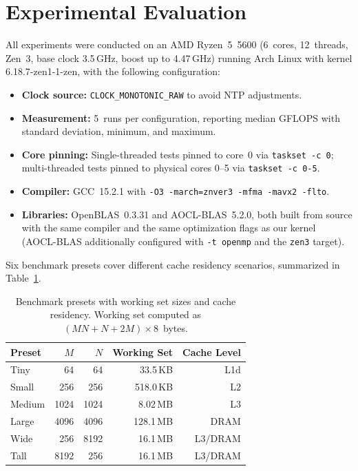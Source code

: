 \documentclass[runningheads]{llncs}
\begin{document}
\section{Experimental Evaluation}
\label{sec:results}

All experiments were conducted on an AMD Ryzen~5~5600 (6~cores, 12~threads,
Zen~3, base clock 3.5\,GHz, boost up to 4.47\,GHz) running Arch Linux with
kernel 6.18.7-zen1-1-zen, with the following configuration:

\begin{itemize}
\item \textbf{Clock source:} \texttt{CLOCK\_MONOTONIC\_RAW} to avoid NTP
      adjustments.
\item \textbf{Measurement:} 5~runs per configuration, reporting median GFLOPS
      with standard deviation, minimum, and maximum.
\item \textbf{Core pinning:} Single-threaded tests pinned to core~0 via
      \texttt{taskset -c 0}; multi-threaded tests pinned to physical cores
      0--5 via \texttt{taskset -c 0-5}.
\item \textbf{Compiler:} GCC~15.2.1 with \texttt{-O3 -march=znver3 -mfma
      -mavx2 -flto}.
\item \textbf{Libraries:} OpenBLAS~0.3.31 and AOCL-BLAS~5.2.0, both built
      from source with the same compiler and the same optimization flags as
      our kernel (AOCL-BLAS additionally configured with \texttt{-t openmp}
      and the \texttt{zen3} target).
\end{itemize}

Six benchmark presets cover different cache residency scenarios, summarized in
Table~\ref{tab:presets}.

\begin{table}[t]
\centering
\caption{Benchmark presets with working set sizes and cache residency.
Working set computed as $(MN + N + 2M) \times 8$~bytes.}
\label{tab:presets}
\begin{tabular}{@{}lrrrr@{}}
\toprule
\textbf{Preset} & \textbf{$M$} & \textbf{$N$} & \textbf{Working Set} &
\textbf{Cache Level} \\
\midrule
Tiny   &   64 &   64 &   33.5\,KB & L1d \\
Small  &  256 &  256 &  518.0\,KB & L2 \\
Medium & 1024 & 1024 &  8.02\,MB  & L3 \\
Large  & 4096 & 4096 &  128.1\,MB & DRAM \\
Wide   &  256 & 8192 &  16.1\,MB  & L3/DRAM \\
Tall   & 8192 &  256 &  16.1\,MB  & L3/DRAM \\
\bottomrule
\end{tabular}
\end{table}
\end{document}
